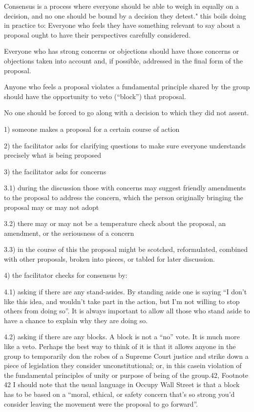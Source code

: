 \documentclass{article}
\begin{document}
Consensus is a process where everyone should be able to weigh in equally on a decision, and no one should be bound by a decision they detest."
this boils doing in practice to: Everyone who feels they have something relevant to say about a proposal ought to have their perspectives carefully considered.

Everyone who has strong concerns or objections should have those concerns or objections taken into account and, if possible, addressed in the final form of the proposal.

Anyone who feels a proposal violates a fundamental principle shared by the group should have the opportunity to veto (“block”) that proposal.

No one should be forced to go along with a decision to which they did not assent.

1) someone makes a proposal for a certain course of action

2) the facilitator asks for clarifying questions to make sure everyone understands precisely what is being proposed

3) the facilitator asks for concerns

3.1) during the discussion those with concerns may suggest friendly amendments to the proposal to address the concern, which the person originally bringing the proposal may or may not adopt

3.2) there may or may not be a temperature check about the proposal, an amendment, or the seriousness of a concern

3.3) in the course of this the proposal might be scotched, reformulated, combined with other proposals, broken into pieces, or tabled for later discussion.

4) the facilitator checks for consensus by:

4.1) asking if there are any stand-asides. By standing aside one is saying “I don’t like this idea, and wouldn’t take part in the action, but I’m not willing to stop others from doing so”. It is always important to allow all those who stand aside to have a chance to explain why they are doing so.

4.2) asking if there are any blocks. A block is not a “no” vote. It is much more like a veto. Perhaps the best way to think of it is that it allows anyone in the group to temporarily don the robes of a Supreme Court justice and strike down a piece of legislation they consider unconstitutional; or, in this casein violation of the fundamental principles of unity or purpose of being of the group.{42},
Footnote {42} I should note that the usual language in Occupy Wall Street is that a block has to be based on a “moral, ethical, or safety concern that’s so strong you’d consider leaving the movement were the proposal to go forward”.
\end{document}
